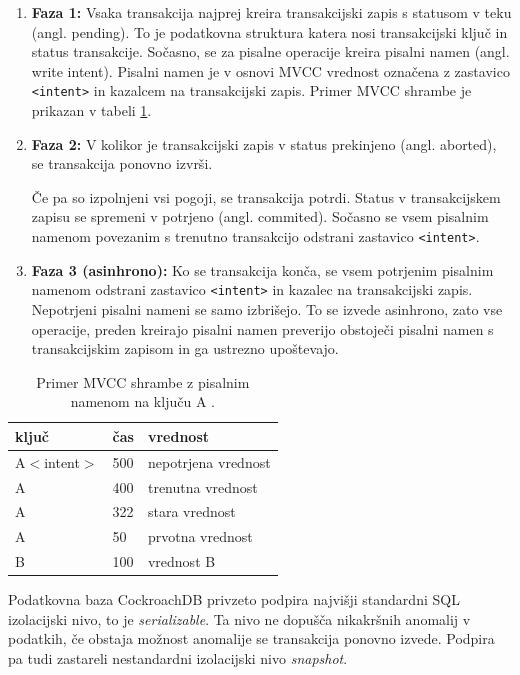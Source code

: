 \documentclass[a4paper, 12pt]{book}
\begin{document}
\begin{enumerate}
    \item \textbf{Faza 1:} Vsaka transakcija najprej kreira transakcijski zapis s statusom v teku (angl. pending). To je podatkovna struktura katera nosi transakcijski ključ in status transakcije. Sočasno, se za pisalne operacije kreira pisalni namen (angl. write intent). Pisalni namen je v osnovi MVCC vrednost označena z zastavico \texttt{<intent>} in kazalcem na transakcijski zapis. Primer MVCC shrambe je prikazan v tabeli \ref{tbl_crdb_mvcc_store}.
    \item \textbf{Faza 2:} V kolikor je transakcijski zapis v status prekinjeno (angl. aborted), se transakcija ponovno izvrši.
    
    Če pa so izpolnjeni vsi pogoji, se transakcija potrdi. Status v transakcijskem zapisu se spremeni v potrjeno (angl. commited). Sočasno se vsem pisalnim namenom povezanim s trenutno transakcijo odstrani zastavico \texttt{<intent>}. 
    \item \textbf{Faza 3 (asinhrono):} Ko se transakcija konča, se vsem potrjenim pisalnim namenom odstrani zastavico \texttt{<intent>} in kazalec na transakcijski zapis. Nepotrjeni pisalni nameni se samo izbrišejo. To se izvede asinhrono, zato vse operacije, preden kreirajo pisalni namen preverijo obstoječi pisalni namen s transakcijskim zapisom in ga ustrezno upoštevajo.
\end{enumerate}

\begin{table}[H]
\begin{center}
\begin{tabular}{ |l|l|l| } 
\hline
\textbf{ključ} & \textbf{čas} & \textbf{vrednost} \\
\hline
A$<$intent$>$ & 500 & nepotrjena vrednost \\
A & 400 & trenutna vrednost \\ 
A & 322 & stara vrednost \\ 
A & 50 & prvotna vrednost \\
B & 100 & vrednost B \\
\hline
\end{tabular}
\end{center}
\caption{Primer MVCC shrambe z pisalnim namenom na ključu A \cite{CRDB-blog-transaction-isolation}.}
\label{tbl_crdb_mvcc_store}
\end{table}

Podatkovna baza CockroachDB privzeto podpira najvišji standardni SQL izolacijski nivo, to je \textit{serializable}. Ta nivo ne dopušča nikakršnih anomalij v podatkih, če obstaja možnost anomalije se transakcija ponovno izvede. Podpira pa tudi zastareli nestandardni izolacijski nivo \textit{snapshot}.
\end{document}
